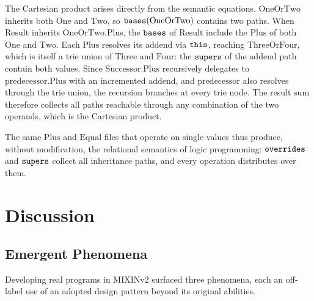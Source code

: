 The Cartesian product arises directly from the semantic equations.
$\mathrm{OneOrTwo}$ inherits both $\mathrm{One}$ and $\mathrm{Two}$,
so $\mathtt{bases}(\mathrm{OneOrTwo})$ contains two paths.
When $\mathrm{Result}$ inherits
$\mathrm{OneOrTwo}.\mathrm{Plus}$, the $\mathtt{bases}$ of
$\mathrm{Result}$ include the $\mathrm{Plus}$ of both
$\mathrm{One}$ and $\mathrm{Two}$.
Each $\mathrm{Plus}$ resolves its $\mathrm{addend}$ via
$\mathtt{this}$, reaching $\mathrm{ThreeOrFour}$, which is itself a
trie union of $\mathrm{Three}$ and $\mathrm{Four}$:
the $\mathtt{supers}$ of the $\mathrm{addend}$ path contain both values.
Since $\mathrm{Successor}.\mathrm{Plus}$ recursively delegates to
$\mathrm{predecessor}.\mathrm{Plus}$ with an incremented addend,
and $\mathrm{predecessor}$ also resolves through the trie union,
the recursion branches at every trie node.
The result $\mathrm{sum}$ therefore collects all paths reachable
through any combination of the two operands, which is the
Cartesian product.

The same $\mathrm{Plus}$ and $\mathrm{Equal}$ files that operate on
single values thus produce, without modification, the relational
semantics of logic programming:
$\mathtt{overrides}$ and $\mathtt{supers}$ collect all inheritance paths, and
every operation distributes over them.

\section{Discussion}

\subsection{Emergent Phenomena}
\label{sec:emergent-phenomena}

Developing real programs in MIXINv2 surfaced three phenomena, each an
off-label use of an adopted design pattern beyond its original abilities.

